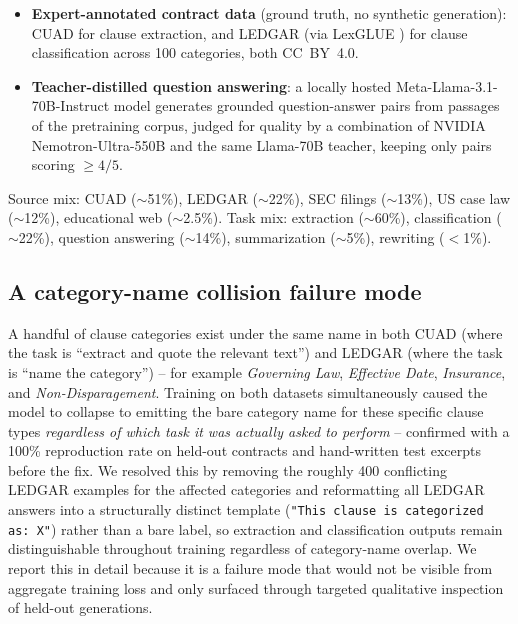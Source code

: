 \documentclass[11pt]{article}
\begin{document}
\begin{itemize}[nosep]
  \item \textbf{Expert-annotated contract data} (ground truth, no
    synthetic generation): CUAD \citep{hendrycks2021cuad} for clause
    extraction, and LEDGAR (via LexGLUE \citep{chalkidis2021lexglue}) for
    clause classification across 100 categories, both CC~BY~4.0.
  \item \textbf{Teacher-distilled question answering}: a locally hosted
    Meta-Llama-3.1-70B-Instruct model generates grounded question-answer
    pairs from passages of the pretraining corpus, judged for quality by
    a combination of NVIDIA Nemotron-Ultra-550B and the same Llama-70B
    teacher, keeping only pairs scoring $\geq 4/5$.
\end{itemize}

Source mix: CUAD ($\sim$51\%), LEDGAR ($\sim$22\%), SEC filings
($\sim$13\%), US case law ($\sim$12\%), educational web ($\sim$2.5\%).
Task mix: extraction ($\sim$60\%), classification ($\sim$22\%), question
answering ($\sim$14\%), summarization ($\sim$5\%), rewriting ($<$1\%).

\subsection{A category-name collision failure mode}
\label{sec:collision}

A handful of clause categories exist under the same name in both CUAD
(where the task is ``extract and quote the relevant text'') and LEDGAR
(where the task is ``name the category'') -- for example \emph{Governing
Law}, \emph{Effective Date}, \emph{Insurance}, and
\emph{Non-Disparagement}. Training on both datasets simultaneously caused
the model to collapse to emitting the bare category name for these
specific clause types \emph{regardless of which task it was actually
asked to perform} -- confirmed with a 100\% reproduction rate on
held-out contracts and hand-written test excerpts before the fix. We
resolved this by removing the roughly 400 conflicting LEDGAR examples for
the affected categories and reformatting all LEDGAR answers into a
structurally distinct template (\texttt{"This clause is categorized as:
X"}) rather than a bare label, so extraction and classification outputs
remain distinguishable throughout training regardless of category-name
overlap. We report this in detail because it is a failure mode that would
not be visible from aggregate training loss and only surfaced through
targeted qualitative inspection of held-out generations.
\end{document}
